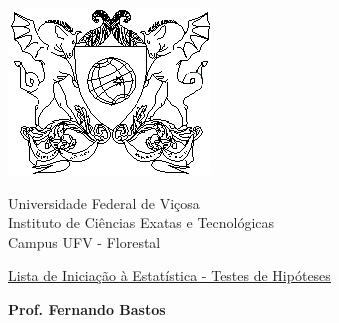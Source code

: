 \documentclass{report}
\begin{document}
\vspace*{-2cm}

\begin{center}
\begin{minipage}[s]{2cm}
\hspace{-1.3cm}\includegraphics[scale=1.0]{Figuras/brasaoufv.eps}
\end{minipage}
\begin{minipage}[s]{13cm}
{\begin{center} {\sc \Large Universidade Federal de Vi\c{c}osa}\\
{\sc \large Instituto de Ci\^encias Exatas e Tecnológicas}\\
{\sc \large Campus UFV - Florestal}\\
\end{center}}
\end{minipage}\begin{minipage}[s]{2 cm}
\end{minipage}
\end{center}

\vspace{-0.3cm}



\medskip

\begin{center}

\underline{\underline{{\large{\sc Lista de Iniciação à Estatística - Testes de Hipóteses}}}}

\bigskip

{\large {\bf Prof. Fernando Bastos}}
%
\end{center}
\end{document}
